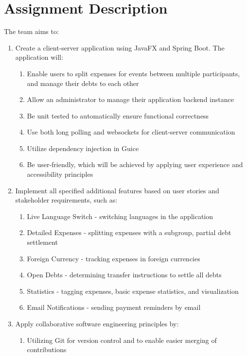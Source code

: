 \section{Assignment Description}
The team aims to:
\begin{enumerate}
    \item Create a client-server application using JavaFX and Spring Boot. The application will:
    \begin{enumerate}
        \item Enable users to split expenses for events between multiple participants, and manage their debts to each other
        \item Allow an administrator to manage their application backend instance
        \item Be unit tested to automatically ensure functional correctness
        \item Use both long polling and websockets for client-server communication
        \item Utilize dependency injection in Guice
        \item Be user-friendly, which will be achieved by applying user experience and accessibility principles
    \end{enumerate}
    \item Implement all specified additional features based on user stories and stakeholder requirements, such as:
    \begin{enumerate}
        \item Live Language Switch - switching languages in the application
        \item Detailed Expenses - splitting expenses with a subgroup, partial debt settlement
        \item Foreign Currency - tracking expenses in foreign currencies
        \item Open Debts - determining transfer instructions to settle all debts
        \item Statistics - tagging expenses, basic expense statistics, and visualization
        \item Email Notifications - sending payment reminders by email
    \end{enumerate}
    \item Apply collaborative software engineering principles by:
    \begin{enumerate}
        \item Utilizing Git for version control and to enable easier merging of contributions

\end{enumerate}
\end{enumerate}
